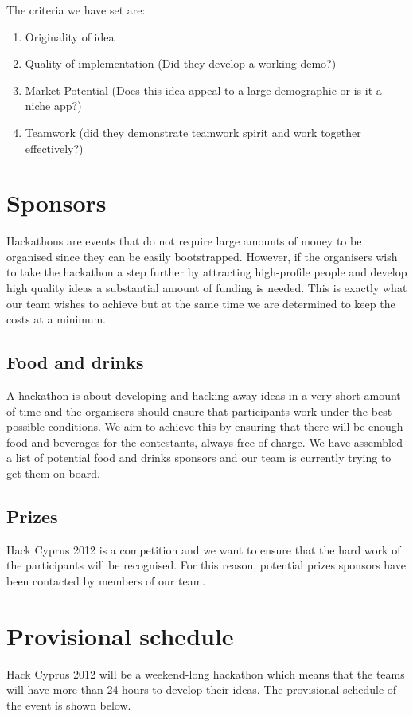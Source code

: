 \documentclass[a4paper,11pt]{report}
\begin{document}
The criteria we have set are:
\begin{enumerate}
  \item Originality of idea
  \item Quality of implementation (Did they develop a working demo?) 
  \item Market Potential (Does this idea appeal to a large demographic or is it a niche app?)
  \item Teamwork (did they demonstrate teamwork spirit and work together effectively?)
\end{enumerate}

\section{Sponsors}
Hackathons are events that do not require large amounts of money to be organised since they can be easily bootstrapped. However, if the organisers wish to take the hackathon a step further by attracting high-profile people and develop high quality ideas a substantial amount of funding is needed. This is exactly what our team wishes to achieve but at the same time we are determined to keep the costs at a minimum. 
 
\subsection{Food and drinks}
A hackathon is about developing and hacking away ideas in a very short amount of time and the organisers should ensure that participants work under the best possible conditions. We aim to achieve this by ensuring that there will be enough food and beverages for the contestants, always free of charge. We have assembled a list of potential food and drinks sponsors and our team is currently trying to get them on board.  

\subsection{Prizes}
Hack Cyprus 2012 is a competition and we want to ensure that the hard work of the participants will be recognised. For this reason, potential prizes sponsors have been contacted by members of our team. 

\section{Provisional schedule}
Hack Cyprus 2012 will be a weekend-long hackathon which means that the teams will have more than 24 hours to develop their ideas. The provisional schedule of the event is shown below. \\
\end{document}
